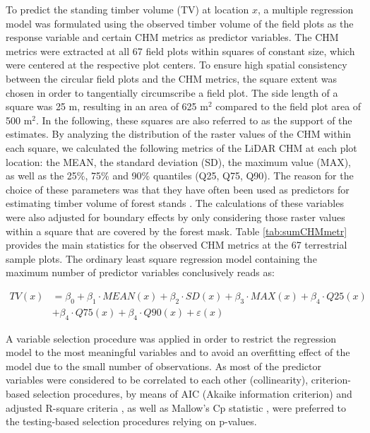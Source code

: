 To predict the standing timber volume (TV) at location $x$, a multiple regression model was formulated using the observed timber volume of the field plots as the response variable and certain CHM metrics as predictor variables. The CHM metrics were extracted at all 67 field plots within squares of constant size, which were centered at the respective plot centers. To ensure high spatial consistency between the circular field plots and the CHM metrics, the square extent was chosen in order to tangentially circumscribe a field plot. The side length of a square was 25 m, resulting in an area of 625 m$^2$ compared to the field plot area of 500 m$^2$. In the following, these squares are also referred to as the support of the estimates. By analyzing the distribution of the raster values of the CHM within each square, we calculated the following metrics of the LiDAR CHM at each plot location: the MEAN, the standard deviation (SD), the maximum value (MAX), as well as the 25\%, 75\% and 90\% quantiles (Q25, Q75, Q90). The reason for the choice of these parameters was that they have often been used as predictors for estimating timber volume of forest stands \citep{holmgren2004, naesset2002, lefsky1999, magnussen1999}. The calculations of these variables were also adjusted for boundary effects by only considering those raster values within a square that are covered by the forest mask. Table \ref{tab:sumCHMmetr} provides the main statistics for the observed CHM metrics at the 67 terrestrial sample plots. The ordinary least square regression model containing the maximum number of predictor variables conclusively reads as:

\begin{equation}\label{eq:regmod}
\begin{aligned}
TV(x) & = \beta_0 + \beta_{1} \cdot MEAN(x) + \beta_{2} \cdot SD(x) + \beta_{3} \cdot MAX(x) + \beta_{4} \cdot Q25(x) \\ 
& + \beta_{4} \cdot Q75(x) + \beta_{4} \cdot Q90(x) + \varepsilon(x)
\end{aligned}
\end{equation}

A variable selection procedure was applied in order to restrict the regression model to the most meaningful variables and to avoid an overfitting effect of the model \citep{draper2014} due to the small number of observations. As most of the predictor variables were considered to be correlated to each other (collinearity), criterion-based selection procedures, by means of AIC (Akaike information criterion) \citep{akaike1992} and adjusted R-square criteria \citep{srivastava1995}, as well as Mallow's Cp statistic \citep{mallows2000}, were preferred to the testing-based selection procedures relying on p-values.

